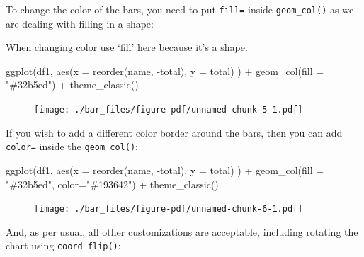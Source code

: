 \documentclass[
  letterpaper,
  DIV=11,
  numbers=noendperiod]{scrreprt}
\newenvironment{Shaded}{\begin{snugshade}}{\end{snugshade}}
\newcommand{\AttributeTok}[1]{\textcolor[rgb]{0.40,0.45,0.13}{#1}}
\newcommand{\FunctionTok}[1]{\textcolor[rgb]{0.28,0.35,0.67}{#1}}
\newcommand{\NormalTok}[1]{\textcolor[rgb]{0.00,0.23,0.31}{#1}}
\newcommand{\SpecialCharTok}[1]{\textcolor[rgb]{0.37,0.37,0.37}{#1}}
\newcommand{\StringTok}[1]{\textcolor[rgb]{0.13,0.47,0.30}{#1}}
\begin{document}
To change the color of the bars, you need to put \texttt{fill=} inside
\texttt{geom\_col()} as we are dealing with filling in a shape:

When changing color use `fill' here because it's a shape.

\begin{Shaded}
\begin{Highlighting}[]
\FunctionTok{ggplot}\NormalTok{(df1, }\FunctionTok{aes}\NormalTok{(}\AttributeTok{x =} \FunctionTok{reorder}\NormalTok{(name, }\SpecialCharTok{{-}}\NormalTok{total), }\AttributeTok{y =}\NormalTok{ total) ) }\SpecialCharTok{+} 
  \FunctionTok{geom\_col}\NormalTok{(}\AttributeTok{fill =} \StringTok{"\#32b5ed"}\NormalTok{) }\SpecialCharTok{+}
  \FunctionTok{theme\_classic}\NormalTok{()}
\end{Highlighting}
\end{Shaded}

\begin{figure}[H]

{\centering \texttt{[image: ./bar\_files/figure-pdf/unnamed-chunk-5-1.pdf]}

}

\end{figure}

If you wish to add a different color border around the bars, then you
can add \texttt{color=} inside the \texttt{geom\_col()}:

\begin{Shaded}
\begin{Highlighting}[]
\FunctionTok{ggplot}\NormalTok{(df1, }\FunctionTok{aes}\NormalTok{(}\AttributeTok{x =} \FunctionTok{reorder}\NormalTok{(name, }\SpecialCharTok{{-}}\NormalTok{total), }\AttributeTok{y =}\NormalTok{ total) ) }\SpecialCharTok{+} 
  \FunctionTok{geom\_col}\NormalTok{(}\AttributeTok{fill =} \StringTok{"\#32b5ed"}\NormalTok{, }\AttributeTok{color=}\StringTok{"\#193642"}\NormalTok{) }\SpecialCharTok{+}
  \FunctionTok{theme\_classic}\NormalTok{()}
\end{Highlighting}
\end{Shaded}

\begin{figure}[H]

{\centering \texttt{[image: ./bar\_files/figure-pdf/unnamed-chunk-6-1.pdf]}

}

\end{figure}

And, as per usual, all other customizations are acceptable, including
rotating the chart using \texttt{coord\_flip()}:
\end{document}
